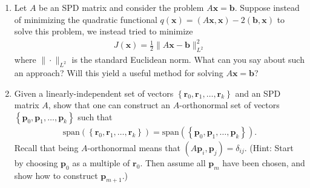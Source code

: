 \documentclass[11pt]{amsart}
\theoremstyle{plain}
\theoremstyle{definition}
\theoremstyle{remark}
\newcommand{\vect}[1]{\mathbf{#1}}
\newcommand{\br}{\vect{r}}
\newcommand{\bp}{\vect{p}}
\newcommand{\bx}{\vect{x}}
\newcommand{\set}[1]{\left\{#1\right\}}
\begin{document}
\begin{enumerate}
\item Let $A$ be an SPD matrix and consider the problem $A\bx = \mathbf{b}$.  Suppose instead of minimizing the quadratic functional $q(\bx) = (A\bx,\bx)-2(\mathbf{b},\bx)$ to solve this problem, we instead tried to minimize 
\begin{align*}
 J(\bx) =\frac{1}{2}\|A\bx - \mathbf{b}\|_{L^2}^2
\end{align*}
where $\|\cdot\|_{L^2}$ is the standard Euclidean norm.  What can you say about such an approach?  Will this yield a useful method  for solving $A\bx = \mathbf{b}$?

\item Given a linearly-independent set of vectors $\set{\br_0,\br_1,\ldots,\br_k}$ and an SPD matrix $A$, show that one can construct an $A$-orthonormal set of vectors  $\set{\bp_0,\bp_1,\ldots,\bp_k}$ such that 
\begin{align*}
 \text{span}(\set{\br_0,\br_1,\ldots,\br_k}) = \text{span}(\set{\bp_0,\bp_1,\ldots,\bp_k}).
\end{align*}
Recall that being $A$-orthonormal means that $(A\bp_i,\bp_j) = \delta_{ij}$.  (Hint: Start by choosing $\bp_0$ as a multiple of $\br_0$.  Then assume all $\bp_m$ have been chosen, and show how to construct $\bp_{m+1}$.)


\end{enumerate}

  

\end{document}
